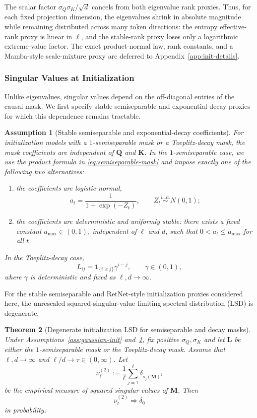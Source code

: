 \documentclass{article}
\newcommand{\weak}{\Rightarrow}
\newcommand{\one}{\mathbf{1}}
\newcommand{\bM}{\mathbf{M}}
\newcommand{\bL}{\mathbf{L}}
\newcommand{\bQ}{\mathbf{Q}}
\newcommand{\bK}{\mathbf{K}}
\newtheorem{theorem}{Theorem}
\newtheorem{assumption}[theorem]{Assumption}
\theoremstyle{definition}
\theoremstyle{remark}
\begin{document}
The scalar factor $\sigma_Q\sigma_K/\sqrt d$ cancels from both eigenvalue rank
proxies.
Thus, for each fixed projection dimension, the eigenvalues shrink in absolute
magnitude while remaining distributed across many token directions: the
entropy effective-rank proxy is linear in $\ell$, and the stable-rank proxy
loses only a logarithmic extreme-value factor.  The exact product-normal law,
rank constants, and a Mamba-style scale-mixture proxy are deferred to
Appendix~\ref{app:init-details}.

\subsubsection{Singular Values at Initialization}

Unlike eigenvalues, singular values depend on the off-diagonal entries of the
causal mask.  We first specify stable semiseparable and exponential-decay
proxies for which this dependence remains tractable.

\begin{assumption}[Stable semiseparable and exponential-decay coefficients]
For initialization models with a $1$-semiseparable mask or a Toeplitz-decay
mask, the mask coefficients are independent of $\bQ$ and $\bK$.  In the
$1$-semiseparable case, we use the product formula in
\eqref{eq:semiseparable-mask} and impose exactly one of the following two
alternatives:
\begin{enumerate}
\item[(a)] the coefficients are logistic-normal,
\[
    a_t = \frac{1}{1+\exp(-Z_t)},
    \qquad
    Z_t\stackrel{\mathrm{i.i.d.}}{\sim}N(0,1);
\]
\item[(b)] the coefficients are deterministic and uniformly stable: there
    exists a fixed constant $a_{\max}\in(0,1)$, independent of $\ell$ and $d$,
    such that $0<a_t\leq a_{\max}$ for all $t$.
\end{enumerate}
In the Toeplitz-decay case,
\[
    L_{ij}=\one_{\{i\geq j\}}\gamma^{i-j},
    \qquad
    \gamma\in(0,1),
\]
where $\gamma$ is deterministic and fixed as $\ell,d\to\infty$.
\label{ass:logistic-normal-mask}
\end{assumption}


For the stable semiseparable and RetNet-style initialization proxies considered
here, the unrescaled squared-singular-value limiting spectral distribution
(LSD) is degenerate.

\begin{theorem}[Degenerate initialization LSD for semiseparable and decay masks]
\label{thm:init-degenerate-semiseparable-decay}
Under Assumptions~\ref{ass:gaussian-init}
and~\ref{ass:logistic-normal-mask}, fix positive $\sigma_Q,\sigma_K$ and let $\bL$
be either the $1$-semiseparable mask or the Toeplitz-decay mask.  Assume that
$\ell,d\to\infty$ and $\ell/d\to\tau\in(0,\infty)$.  Let
\[
    \nu_{\ell}^{(2)}
    :=
    \frac1\ell\sum_{j=1}^{\ell}\delta_{s_j(\bM)^2}
\]
be the empirical measure of squared singular values of $\bM$.  Then
\[
    \nu_{\ell}^{(2)}\weak\delta_0
\]
in probability.
\end{theorem}
\end{document}
